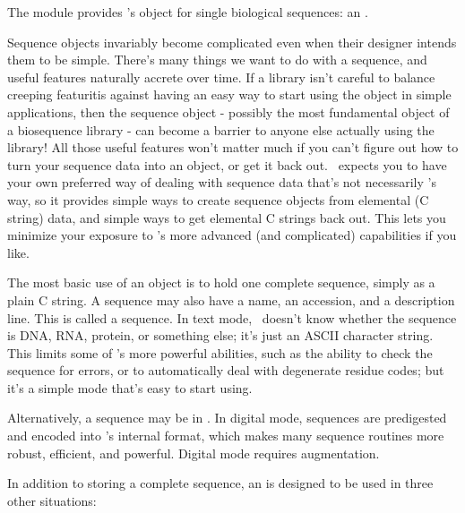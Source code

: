 The  module provides \Easel's object for single biological
sequences: an .

Sequence objects invariably become complicated even when their
designer intends them to be simple. There's many things we want to do
with a sequence, and useful features naturally accrete over time. If a
library isn't careful to balance creeping featuritis against having an
easy way to start using the object in simple applications, then the
sequence object - possibly the most fundamental object of a
biosequence library - can become a barrier to anyone else actually
using the library! All those useful features won't matter much if you
can't figure out how to turn your sequence data into an object, or get
it back out. \Easel\ expects you to have your own preferred way of
dealing with sequence data that's not necessarily \Easel's way, so it
provides simple ways to create sequence objects from elemental (C
string) data, and simple ways to get elemental C strings back out.
This lets you minimize your exposure to \Easel's more advanced (and
complicated) capabilities if you like.

The most basic use of an  object is to hold one
complete sequence, simply as a plain C string. A sequence may also
have a name, an accession, and a description line.  This is called a
 sequence. In text mode, \Easel\ doesn't know
whether the sequence is DNA, RNA, protein, or something else; it's
just an ASCII character string. This limits some of \Easel's more
powerful abilities, such as the ability to check the sequence for
errors, or to automatically deal with degenerate residue codes; but
it's a simple mode that's easy to start using.

Alternatively, a sequence may be in . In digital
mode, sequences are predigested and encoded into \Easel's internal
format, which makes many sequence routines more robust, efficient, and
powerful. Digital mode requires  augmentation.

In addition to storing a complete sequence, an  is
designed to be used in three other situations:

